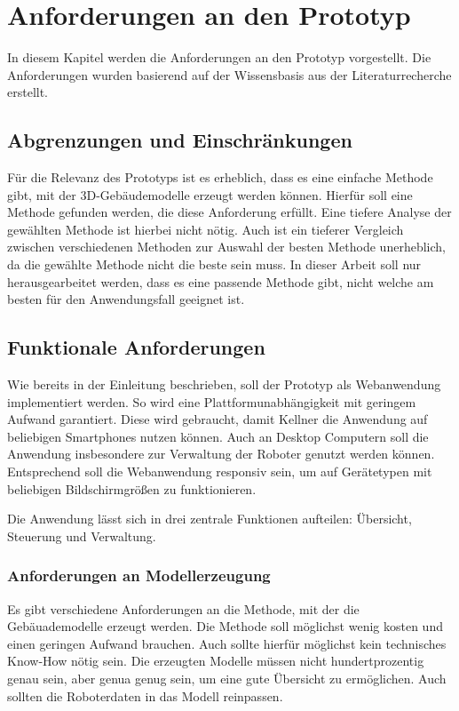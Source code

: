 \newpage
\section{Anforderungen an den Prototyp}
In diesem Kapitel werden die Anforderungen an den Prototyp vorgestellt. Die Anforderungen wurden basierend auf der Wissensbasis aus der Literaturrecherche erstellt.

\subsection{Abgrenzungen und Einschränkungen}

Für die Relevanz des Prototyps ist es erheblich, dass es eine einfache Methode gibt, mit der 3D-Gebäudemodelle erzeugt werden können. Hierfür soll eine Methode gefunden werden, die diese Anforderung erfüllt. Eine tiefere Analyse der gewählten Methode ist hierbei nicht nötig. Auch ist ein tieferer Vergleich zwischen verschiedenen Methoden zur Auswahl der besten Methode unerheblich, da die gewählte Methode nicht die beste sein muss. In dieser Arbeit soll nur herausgearbeitet werden, dass es eine passende Methode gibt, nicht welche am besten für den Anwendungsfall geeignet ist.

\subsection{Funktionale Anforderungen}\label{sec:FunctionalRequirements}
Wie bereits in der Einleitung beschrieben, soll der Prototyp als Webanwendung implementiert werden. So wird eine Plattformunabhängigkeit mit geringem Aufwand garantiert. Diese wird gebraucht, damit Kellner die Anwendung auf beliebigen Smartphones nutzen können. Auch an Desktop Computern soll die Anwendung insbesondere zur Verwaltung der Roboter genutzt werden können. Entsprechend soll die Webanwendung responsiv sein, um auf Gerätetypen mit beliebigen Bildschirmgrößen zu funktionieren.

Die Anwendung lässt sich in drei zentrale Funktionen aufteilen: Übersicht, Steuerung und Verwaltung.

\subsubsection{Anforderungen an Modellerzeugung}
Es gibt verschiedene Anforderungen an die Methode, mit der die Gebäuademodelle erzeugt werden. Die Methode soll möglichst wenig kosten und einen geringen Aufwand brauchen. Auch sollte hierfür möglichst kein technisches Know-How nötig sein. Die erzeugten Modelle müssen nicht hundertprozentig genau sein, aber genua genug sein, um eine gute Übersicht zu ermöglichen. Auch sollten die Roboterdaten in das Modell reinpassen.

